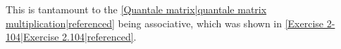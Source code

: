This is tantamount to the \ref{Quantale matrix|quantale matrix multiplication|referenced} being associative, which was shown in \ref{Exercise 2-104|Exercise 2.104|referenced}.
